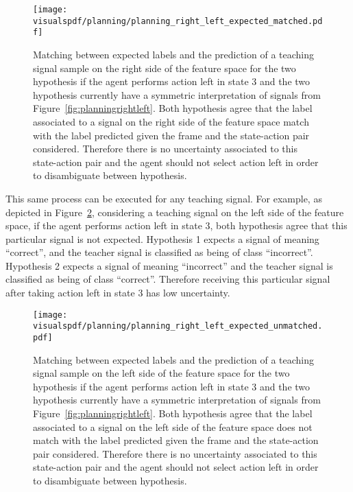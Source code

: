 \begin{figure}[!htbp]
  \centering
  \texttt{[image: \\visualspdf/planning/planning\_right\_left\_expected\_matched.pdf]}
  \caption{Matching between expected labels and the prediction of a teaching signal sample on the right side of the feature space for the two hypothesis if the agent performs action left in state 3 and the two hypothesis currently have a symmetric interpretation of signals from Figure~\ref{fig:planningrightleft}. Both hypothesis agree that the label associated to a signal on the right side of the feature space match with the label predicted given the frame and the state-action pair considered. Therefore there is no uncertainty associated to this state-action pair and the agent should not select action left in order to disambiguate between hypothesis.}
  \label{fig:uncertaintymeaningrightleftexpectedleft}
\end{figure}

This same process can be executed for any teaching signal. For example, as depicted in Figure~\ref{fig:uncertaintymeaningrightleftexpectedright}, considering a teaching signal on the left side of the feature space, if the agent performs action left in state 3, both hypothesis agree that this particular signal is not expected. Hypothesis 1 expects a signal of meaning ``correct'', and the teacher signal is classified as being of class ``incorrect''. Hypothesis 2 expects a signal of meaning ``incorrect'' and the teacher signal is classified as being of class ``correct''. Therefore receiving this particular signal after taking action left in state 3 has low uncertainty.

\begin{figure}[!htbp]
  \centering
  \texttt{[image: \\visualspdf/planning/planning\_right\_left\_expected\_unmatched.pdf]}
  \caption{Matching between expected labels and the prediction of a teaching signal sample on the left side of the feature space for the two hypothesis if the agent performs action left in state 3 and the two hypothesis currently have a symmetric interpretation of signals from Figure~\ref{fig:planningrightleft}. Both hypothesis agree that the label associated to a signal on the left side of the feature space does not match with the label predicted given the frame and the state-action pair considered. Therefore there is no uncertainty associated to this state-action pair and the agent should not select action left in order to disambiguate between hypothesis.}
  \label{fig:uncertaintymeaningrightleftexpectedright}
\end{figure}


